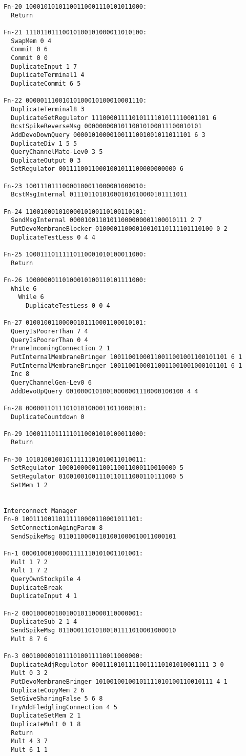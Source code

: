 \begin{verbatim}
Fn-20 10001010101100110001110101011000:
  Return

Fn-21 11101101110010100101000011010100:
  SwapMem 0 4
  Commit 0 6
  Commit 0 0
  DuplicateInput 1 7
  DuplicateTerminal1 4
  DuplicateCommit 6 5

Fn-22 00000111001010100010100010001110:
  DuplicateTerminal8 3
  DuplicateSetRegulator 11100001111010111101011110001101 6
  BcstSpikeReverseMsg 00000000010110010100011100010101
  AddDevoDownQuery 00001010000100111001001011011101 6 3
  DuplicateDiv 1 5 5
  QueryChannelMate-Lev0 3 5
  DuplicateOutput 0 3
  SetRegulator 00111100110001001011100000000000 6

Fn-23 10011101110000100011000001000010:
  BcstMsgInternal 01110110101000101010000101111011

Fn-24 11001000101000010100110100110101:
  SendMsgInternal 00001001101011000000001100010111 2 7
  PutDevoMembraneBlocker 01000011000010010110111101110100 0 2
  DuplicateTestLess 0 4 4

Fn-25 10001110111110110001010100011000:
  Return

Fn-26 10000000110100010100110101111000:
  While 6
    While 6
      DuplicateTestLess 0 0 4

Fn-27 01001001100000101110001100010101:
  QueryIsPoorerThan 7 4
  QueryIsPoorerThan 0 4
  PruneIncomingConnection 2 1
  PutInternalMembraneBringer 10011001000110011001001100101101 6 1
  PutInternalMembraneBringer 10011001000110011001001000101101 6 1
  Inc 8
  QueryChannelGen-Lev0 6
  AddDevoUpQuery 00100001010010000001110000100100 4 4

Fn-28 00000110111010101000011011000101:
  DuplicateCountdown 0

Fn-29 10001110111110110001010100011000:
  Return

Fn-30 10101001001011111101010011010011:
  SetRegulator 10001000001100110011000110010000 5
  SetRegulator 01001001001110110111000110111000 5
  SetMem 1 2


Interconnect Manager
Fn-0 10011100110111110000110001011101:
  SetConnectionAgingParam 8
  SendSpikeMsg 01101100001101001000010011000101

Fn-1 00001000100001111110101001101001:
  Mult 1 7 2
  Mult 1 7 2
  QueryOwnStockpile 4
  DuplicateBreak
  DuplicateInput 4 1

Fn-2 00010000010010010110000110000001:
  DuplicateSub 2 1 4
  SendSpikeMsg 01100011010100101111010001000010
  Mult 8 7 6

Fn-3 00010000010111010011110011000000:
  DuplicateAdjRegulator 00011101011110011110101010001111 3 0
  Mult 0 3 2
  PutDevoMembraneBringer 10100100100101111010100110010111 4 1
  DuplicateCopyMem 2 6
  SetGiveSharingFalse 5 6 8
  TryAddFledglingConnection 4 5
  DuplicateSetMem 2 1
  DuplicateMult 0 1 8
  Return
  Mult 4 3 7
  Mult 6 1 1


\end{verbatim}
